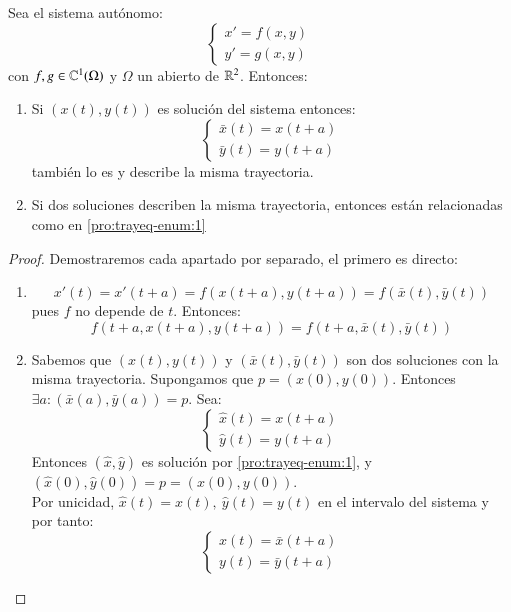 \begin{pro}
    Sea el sistema autónomo:
    $$
        \begin{cases}
            x' = f(x, y)\\
            y' = g(x, y)
        \end{cases}
    $$
    con $f, g \in \mathbb{C}^1(\Omega)$ y $\Omega$ un abierto de $\mathbb{R}^2$. Entonces:
    \begin{enumerate}
        \item \label{pro:trayeq-enum:1} Si $(x(t), y(t))$ es solución del sistema entonces:
        $$\begin{cases}
            \bar{x}(t) = x(t+a)\\
            \bar{y}(t) = y(t+a)
        \end{cases}$$
        también lo es y describe la misma trayectoria.
        \item Si dos soluciones describen la misma trayectoria, entonces están relacionadas como en \ref{pro:trayeq-enum:1}
    \end{enumerate}
\end{pro}
\begin{proof}
    Demostraremos cada apartado por separado, el primero es directo:
    \begin{enumerate}
        \item
        $$
            x'(t) = x'(t+a) = f(x(t+a), y(t+a)) = f(\bar{x}(t), \bar{y}(t))
        $$
        pues $f$ no depende de $t$. Entonces:
        $$
            f(t+a, x(t+a), y(t+a)) = f(t+a, \bar{x}(t), \bar{y}(t))
        $$
        \item Sabemos que $(x(t), y(t))$ y $(\bar{x}(t), \bar{y}(t))$ son dos soluciones con la misma trayectoria. Supongamos que $p = (x(0), y(0))$. Entonces $\exists a : (\bar{x}(a), \bar{y}(a)) = p$. Sea:
        $$
        \begin{cases}
            \hat{x}(t) = x(t+a)\\
            \hat{y}(t) = y(t+a)
        \end{cases}
        $$
        Entonces $(\hat{x}, \hat{y})$ es solución por \ref{pro:trayeq-enum:1}, y $(\hat{x}(0), \hat{y}(0)) = p = (x(0), y(0))$.\\
        Por unicidad, $\hat{x}(t) = x(t),\ \hat{y}(t) = y(t)$ en el intervalo del sistema y por tanto:
        $$
            \begin{cases}
                x(t) = \bar{x}(t+a)\\
                y(t) = \bar{y}(t+a)
            \end{cases}
        $$
    \end{enumerate}
\end{proof}
